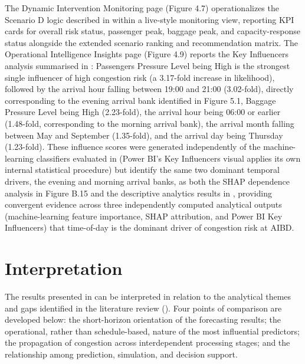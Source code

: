 The Dynamic Intervention Monitoring page (Figure 4.7) operationalizes the Scenario D logic described in  within a live-style monitoring view, reporting KPI cards for overall risk status, passenger peak, baggage peak, and capacity-response status alongside the extended scenario ranking and recommendation matrix. The Operational Intelligence Insights page (Figure 4.9) reports the Key Influencers analysis summarised in : Passengers Pressure Level being High is the strongest single influencer of high congestion risk (a 3.17-fold increase in likelihood), followed by the arrival hour falling between 19:00 and 21:00 (3.02-fold), directly corresponding to the evening arrival bank identified in Figure 5.1, Baggage Pressure Level being High (2.23-fold), the arrival hour being 06:00 or earlier (1.48-fold, corresponding to the morning arrival bank), the arrival month falling between May and September (1.35-fold), and the arrival day being Thursday (1.23-fold). These influence scores were generated independently of the machine-learning classifiers evaluated in  (Power BI’s Key Influencers visual applies its own internal statistical procedure) but identify the same two dominant temporal drivers, the evening and morning arrival banks, as both the SHAP dependence analysis in Figure B.15 and the descriptive analytics results in , providing convergent evidence across three independently computed analytical outputs (machine-learning feature importance, SHAP attribution, and Power BI Key Influencers) that time-of-day is the dominant driver of congestion risk at AIBD.

\section{Interpretation}
\label{sec:interpretation}

The results presented in  can be interpreted in relation to the analytical themes and gaps identified in the literature review (). Four points of comparison are developed below: the short-horizon orientation of the forecasting results; the operational, rather than schedule-based, nature of the most influential predictors; the propagation of congestion across interdependent processing stages; and the relationship among prediction, simulation, and decision support.


